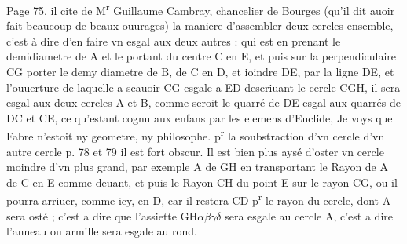 \documentclass[11pt,a4paper]{article}
\begin{document}
Page 75. il cite de M\textsuperscript{r} Guillaume Cambray, chancelier de Bourges (qu'il dit auoir fait beaucoup de beaux ouurages) la maniere d'assembler deux cercles ensemble, c'est à dire d'en faire vn esgal aux deux autres : qui est en prenant le demidiametre de A et le portant du centre C en E, et puis sur la perpendiculaire CG porter le demy diametre de B, de C en D, et ioindre DE, par la ligne DE, et l'ouuerture de laquelle a scauoir CG esgale a ED descriuant le cercle CGH, il sera esgal aux deux cercles A et B, comme seroit le quarré de DE esgal aux quarrés de DC et CE, ce qu'estant cognu aux enfans par les elemens d'Euclide, Je voys que Fabre n'estoit ny geometre, ny philosophe. p\textsuperscript{r} la soubstraction d'vn cercle d'vn autre cercle p. 78 et 79 il est fort obscur. Il est bien plus aysé d'oster vn cercle moindre d'vn plus grand, par exemple A de GH en transportant le Rayon de A de C en E comme deuant, et puis le Rayon CH du point E sur le rayon CG, ou il pourra arriuer, comme icy, en D, car il restera CD p\textsuperscript{r} le rayon du cercle, dont A sera osté ; c'est a dire que l'assiette GH$\alpha\beta\gamma\delta$ sera esgale au cercle A, c'est a dire l'anneau ou armille sera esgale au rond.


\end{document}
